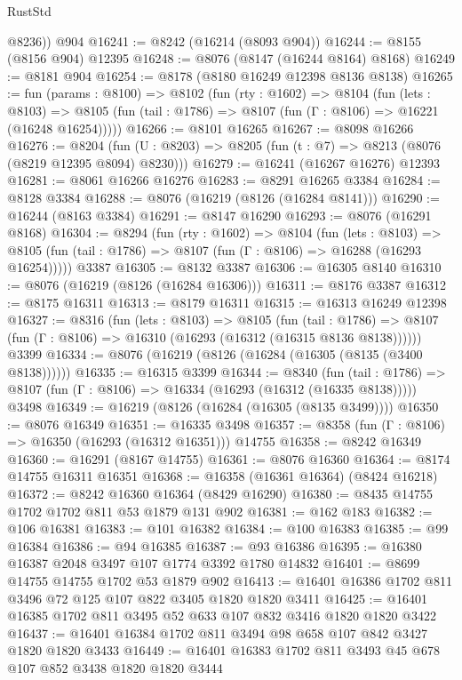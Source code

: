 \begin{lexlean}{RustStd}
\begin{coremodule}
        @8236))
    @904
@16241 := @8242 (@16214 (@8093 @904))
@16244 := @8155 (@8156 @904) @12395
@16248 := @8076 (@8147 (@16244 @8164) @8168)
@16249 := @8181 @904
@16254 := @8178 (@8180 @16249 @12398 @8136 @8138)
@16265 := fun (params : @8100) =>
  @8102
    (fun (rty : @1602) =>
    @8104
      (fun (lets : @8103) =>
      @8105 (fun (tail : @1786) => @8107 (fun (Γ : @8106) => @16221 (@16248 @16254)))))
@16266 := @8101 @16265
@16267 := @8098 @16266
@16276 := @8204
    (fun (U : @8203) => @8205 (fun (t : @7) => @8213 (@8076 (@8219 @12395 @8094) @8230)))
@16279 := @16241 (@16267 @16276) @12393
@16281 := @8061 @16266 @16276
@16283 := @8291 @16265 @3384
@16284 := @8128 @3384
@16288 := @8076 (@16219 (@8126 (@16284 @8141)))
@16290 := @16244 (@8163 @3384)
@16291 := @8147 @16290
@16293 := @8076 (@16291 @8168)
@16304 := @8294
    (fun (rty : @1602) =>
    @8104
      (fun (lets : @8103) =>
      @8105 (fun (tail : @1786) => @8107 (fun (Γ : @8106) => @16288 (@16293 @16254)))))
    @3387
@16305 := @8132 @3387
@16306 := @16305 @8140
@16310 := @8076 (@16219 (@8126 (@16284 @16306)))
@16311 := @8176 @3387
@16312 := @8175 @16311
@16313 := @8179 @16311
@16315 := @16313 @16249 @12398
@16327 := @8316
    (fun (lets : @8103) =>
    @8105
      (fun (tail : @1786) =>
      @8107 (fun (Γ : @8106) => @16310 (@16293 (@16312 (@16315 @8136 @8138))))))
    @3399
@16334 := @8076 (@16219 (@8126 (@16284 (@16305 (@8135 (@3400 @8138))))))
@16335 := @16315 @3399
@16344 := @8340
    (fun (tail : @1786) => @8107 (fun (Γ : @8106) => @16334 (@16293 (@16312 (@16335 @8138)))))
    @3498
@16349 := @16219 (@8126 (@16284 (@16305 (@8135 @3499))))
@16350 := @8076 @16349
@16351 := @16335 @3498
@16357 := @8358 (fun (Γ : @8106) => @16350 (@16293 (@16312 @16351))) @14755
@16358 := @8242 @16349
@16360 := @16291 (@8167 @14755)
@16361 := @8076 @16360
@16364 := @8174 @14755 @16311 @16351
@16368 := @16358 (@16361 @16364) (@8424 @16218)
@16372 := @8242 @16360 @16364 (@8429 @16290)
@16380 := @8435 @14755 @1702 @1702 @811 @53 @1879 @131 @902
@16381 := @162 @183
@16382 := @106 @16381
@16383 := @101 @16382
@16384 := @100 @16383
@16385 := @99 @16384
@16386 := @94 @16385
@16387 := @93 @16386
@16395 := @16380 @16387 @2048 @3497 @107 @1774 @3392 @1780 @14832
@16401 := @8699 @14755 @14755 @1702 @53 @1879 @902
@16413 := @16401 @16386 @1702 @811 @3496 @72 @125 @107 @822 @3405 @1820 @1820 @3411
@16425 := @16401 @16385 @1702 @811 @3495 @52 @633 @107 @832 @3416 @1820 @1820 @3422
@16437 := @16401 @16384 @1702 @811 @3494 @98 @658 @107 @842 @3427 @1820 @1820 @3433
@16449 := @16401 @16383 @1702 @811 @3493 @45 @678 @107 @852 @3438 @1820 @1820 @3444

\end{coremodule}
\end{lexlean}
